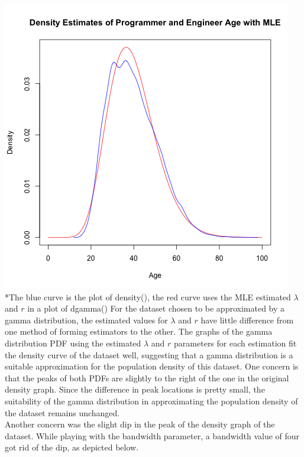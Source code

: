\documentclass[12pt, letterpaper]{article}
\begin{document}
\includegraphics[scale=0.9]{prgeng_age_mle}
\footnotesize
\\ \**The blue curve is the plot of density(), the red curve uses the MLE estimated {$\lambda$} and $r$ in a plot of dgamma()
\newpage
\noindent
\normalsize
For the dataset chosen to be approximated by a gamma distribution, the estimated values for $\lambda$ and $r$ 
have little difference from one method of forming estimators to the other. The graphs of the gamma 
distribution PDF using the estimated $\lambda$ and $r$ parameters for each estimation fit the density 
curve of the dataset well, suggesting that a gamma distribution is a suitable approximation for the 
population density of this dataset. One concern is that the peaks of both PDFs are slightly to the right 
of the one in the original density graph. Since the difference in peak locations is pretty small, the 
suitability of the gamma distribution in approximating the population density of the dataset remains 
unchanged.
\\[0.5\baselineskip]
Another concern was the slight dip in the peak of the density graph of the dataset. While playing with the 
bandwidth parameter, a bandwidth value of four got rid of the dip, as depicted below.
\\
\end{document}
